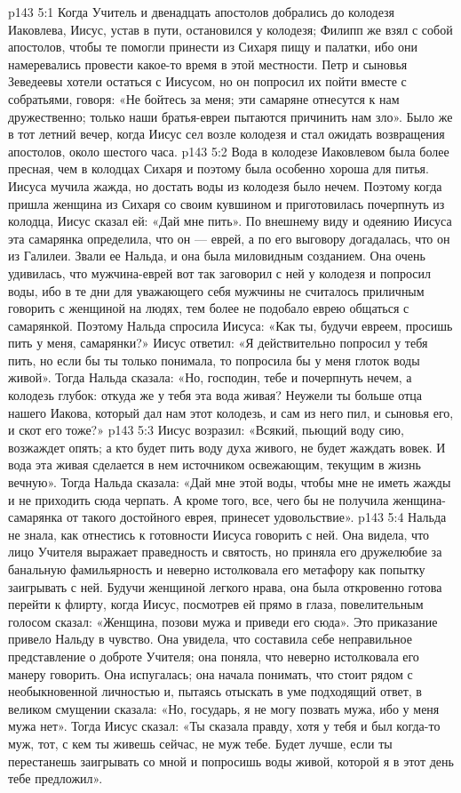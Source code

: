 \vs p143 5:1 Когда Учитель и двенадцать апостолов добрались до колодезя Иаковлева, Иисус, устав в пути, остановился у колодезя; Филипп же взял с собой апостолов, чтобы те помогли принести из Сихаря пищу и палатки, ибо они намеревались провести какое\hyp{}то время в этой местности. Петр и сыновья Зеведеевы хотели остаться с Иисусом, но он попросил их пойти вместе с собратьями, говоря: «Не бойтесь за меня; эти самаряне отнесутся к нам дружественно; только наши братья\hyp{}евреи пытаются причинить нам зло». Было же в тот летний вечер, когда Иисус сел возле колодезя и стал ожидать возвращения апостолов, около шестого часа.
\vs p143 5:2 Вода в колодезе Иаковлевом была более пресная, чем в колодцах Сихаря и поэтому была особенно хороша для питья. Иисуса мучила жажда, но достать воды из колодезя было нечем. Поэтому когда пришла женщина из Сихаря со своим кувшином и приготовилась почерпнуть из колодца, Иисус сказал ей: «Дай мне пить». По внешнему виду и одеянию Иисуса эта самарянка определила, что он --- еврей, а по его выговору догадалась, что он из Галилеи. Звали ее Нальда, и она была миловидным созданием. Она очень удивилась, что мужчина\hyp{}еврей вот так заговорил с ней у колодезя и попросил воды, ибо в те дни для уважающего себя мужчины не считалось приличным говорить с женщиной на людях, тем более не подобало еврею общаться с самарянкой. Поэтому Нальда спросила Иисуса: «Как ты, будучи евреем, просишь пить у меня, самарянки?» Иисус ответил: «Я действительно попросил у тебя пить, но если бы ты только понимала, то попросила бы у меня глоток воды живой». Тогда Нальда сказала: «Но, господин, тебе и почерпнуть нечем, а колодезь глубок: откуда же у тебя эта вода живая? Неужели ты больше отца нашего Иакова, который дал нам этот колодезь, и сам из него пил, и сыновья его, и скот его тоже?»
\vs p143 5:3 Иисус возразил: «Всякий, пьющий воду сию, возжаждет опять; а кто будет пить воду духа живого, не будет жаждать вовек. И вода эта живая сделается в нем источником освежающим, текущим в жизнь вечную». Тогда Нальда сказала: «Дай мне этой воды, чтобы мне не иметь жажды и не приходить сюда черпать. А кроме того, все, чего бы не получила женщина\hyp{}самарянка от такого достойного еврея, принесет удовольствие».
\vs p143 5:4 Нальда не знала, как отнестись к готовности Иисуса говорить с ней. Она видела, что лицо Учителя выражает праведность и святость, но приняла его дружелюбие за банальную фамильярность и неверно истолковала его метафору как попытку заигрывать с ней. Будучи женщиной легкого нрава, она была откровенно готова перейти к флирту, когда Иисус, посмотрев ей прямо в глаза, повелительным голосом сказал: «Женщина, позови мужа и приведи его сюда». Это приказание привело Нальду в чувство. Она увидела, что составила себе неправильное представление о доброте Учителя; она поняла, что неверно истолковала его манеру говорить. Она испугалась; она начала понимать, что стоит рядом с необыкновенной личностью и, пытаясь отыскать в уме подходящий ответ, в великом смущении сказала: «Но, государь, я не могу позвать мужа, ибо у меня мужа нет». Тогда Иисус сказал: «Ты сказала правду, хотя у тебя и был когда\hyp{}то муж, тот, с кем ты живешь сейчас, не муж тебе. Будет лучше, если ты перестанешь заигрывать со мной и попросишь воды живой, которой я в этот день тебе предложил».
